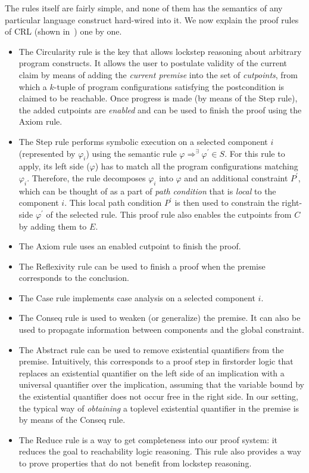 The rules itself are fairly simple, and none of them has the semantics of any particular language construct
hard-wired into it.
We now explain the proof rules of CRL (shown in~) one by one.
\begin{itemize}
  \item The Circularity rule is the key that allows lockstep reasoning about arbitrary program constructs.
        It allows the user to postulate validity of the current claim by means of adding the \emph{current premise}
        into the set of \emph{cutpoints}, from which a $k$-tuple of program configurations satisfying the postcondition
        is claimed to be reachable. Once progress is made (by means of the Step rule), the added cutpoints are
        \emph{enabled} and can be used to finish the proof using the Axiom rule.
  \item The Step rule performs symbolic execution on a selected component $i$ (represented by $\varphi_i$)
        using the semantic rule $\varphi \Rightarrow^\exists \varphi^\prime \in S$.
        For this rule to apply, its left side ($\varphi$) has to match all the program configurations matching $\varphi_i$.
        Therefore, the rule decomposes $\varphi_i$ into $\varphi$ and an additional constraint $P^\prime$,
        which can be thought of as a part of \emph{path condition} that is \emph{local} to the component $i$.
        This local path condition $P^\prime$ is then used to constrain the right-side $\varphi^\prime$ of the selected rule.
        This proof rule also enables the cutpoints from $C$ by adding them to $E$.
  \item The Axiom rule uses an enabled cutpoint to finish the proof.
  \item The Reflexivity rule can be used to finish a proof when the premise corresponds to the conclusion.
  \item The Case rule implements case analysis on a selected component $i$.
  \item The Conseq rule is used to weaken (or generalize) the premise. It can also be used
        to propagate information between components and the global constraint.
  \item The Abstract rule can be used to remove existential quantifiers from the premise.
        Intuitively, this corresponds to a proof step in firstorder logic that replaces
        an existential quantifier on the left side of an implication
        with a universal quantifier over the implication, assuming that the variable
        bound by the existential quantifier does not occur free in the right side.
        In our setting, the typical way of \emph{obtaining} a toplevel existential quantifier in the premise
        is by means of the Conseq rule.
  \item The Reduce rule is a way to get completeness into our proof system:
        it reduces the goal to reachability logic reasoning.
        This rule also provides a way to prove properties that do not benefit
        from lockstep reasoning.

\end{itemize}


